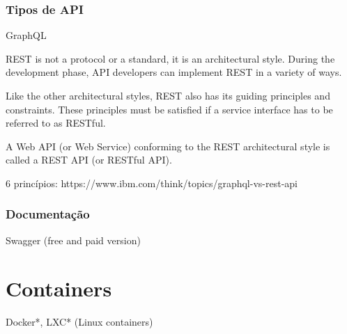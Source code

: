 \subsubsection{Tipos de API}

GraphQL 

REST is not a protocol or a standard, it is an architectural style. During the development phase, API developers can implement REST in a variety of ways.

Like the other architectural styles, REST also has its guiding principles and constraints. These principles must be satisfied if a service interface has to be referred to as RESTful.

A Web API (or Web Service) conforming to the REST architectural style is called a REST API (or RESTful API). 

6 princípios: https://www.ibm.com/think/topics/graphql-vs-rest-api

\subsubsection{Documentação}
Swagger (free and paid version)


\section{Containers}

Docker*, LXC* (Linux containers)



